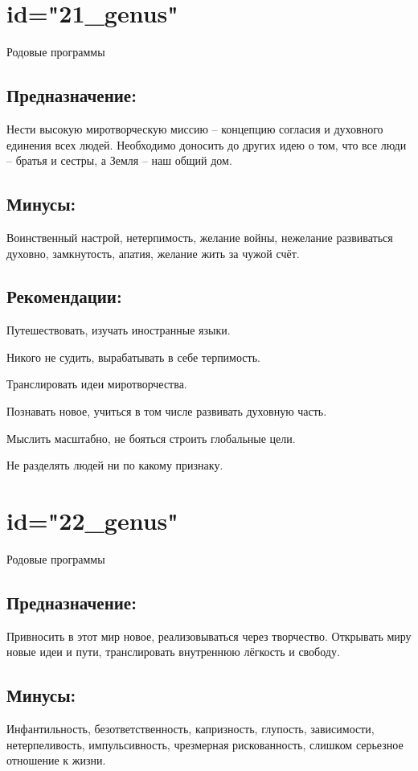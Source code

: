 \endsection

\section{id="21_genus"}{Родовые программы}

\subsection{Предназначение:}
Нести высокую миротворческую миссию – концепцию согласия и 
духовного единения всех людей. Необходимо доносить до других 
идею о том, что все люди – братья и сестры, а Земля – наш общий 
дом.
\endsubsection

\subsection{Минусы:}
Воинственный настрой, нетерпимость, желание войны, нежелание 
развиваться духовно, замкнутость, апатия, желание жить за чужой 
счёт.
\endsubsection

\subsection{Рекомендации:}
\item Путешествовать, изучать иностранные языки.
\item Никого не судить, вырабатывать в себе терпимость.
\item Транслировать идеи миротворчества.
\item Познавать новое, учиться в том числе развивать духовную часть.
\item Мыслить масштабно, не бояться строить глобальные цели.
\item Не разделять людей ни по какому признаку.
\endsubsection

\endsection

\section{id="22_genus"}{Родовые программы}

\subsection{Предназначение:}
Привносить в этот мир новое, реализовываться через творчество. 
Открывать миру новые идеи и пути, транслировать внутреннюю 
лёгкость и свободу.
\endsubsection

\subsection{Минусы:}
Инфантильность, безответственность, капризность, глупость, 
зависимости, нетерпеливость, импульсивность, чрезмерная 
рискованность, слишком серьезное отношение к жизни.
\endsubsection


